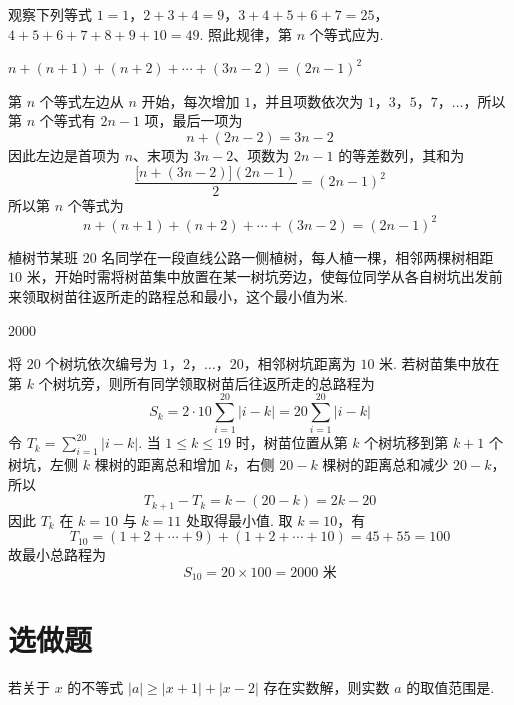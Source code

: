 \begin{problem}
观察下列等式 \(1 = 1\)，\(2 + 3 + 4 = 9\)，\(3 + 4 + 5 + 6 + 7 = 25\)，\(4 + 5 + 6 + 7 + 8 + 9 + 10 = 49\). 照此规律，第 \(n\) 个等式应为\fillinblank{}.
\end{problem}

\begin{answer}
\(n+(n+1)+(n+2)+\cdots+(3n-2)=(2n-1)^2\)
\end{answer}

\begin{solution}
第 \(n\) 个等式左边从 \(n\) 开始，每次增加 \(1\)，并且项数依次为 \(1\)，\(3\)，\(5\)，\(7\)，\(\ldots\)，所以第 \(n\) 个等式有 \(2n-1\) 项，最后一项为
\[
n+(2n-2)=3n-2
\]
因此左边是首项为 \(n\)、末项为 \(3n-2\)、项数为 \(2n-1\) 的等差数列，其和为
\[
\frac{\bigl[n+(3n-2)\bigr](2n-1)}{2}=(2n-1)^2
\]
所以第 \(n\) 个等式为
\[
n+(n+1)+(n+2)+\cdots+(3n-2)=(2n-1)^2
\]
\end{solution}

\begin{problem}
植树节某班 \(20\) 名同学在一段直线公路一侧植树，每人植一棵，相邻两棵树相距 \(10\text{ 米}\)，开始时需将树苗集中放置在某一树坑旁边，使每位同学从各自树坑出发前来领取树苗往返所走的路程总和最小，这个最小值为\fillinblank{}\(\text{米}\).
\end{problem}

\begin{answer}
\(2000\)
\end{answer}

\begin{solution}
将 \(20\) 个树坑依次编号为 \(1\)，\(2\)，\(\ldots\)，\(20\)，相邻树坑距离为 \(10\text{ 米}\). 若树苗集中放在第 \(k\) 个树坑旁，则所有同学领取树苗后往返所走的总路程为
\[
S_k=2\cdot10\sum_{i=1}^{20}|i-k|=20\sum_{i=1}^{20}|i-k|
\]
令 \(T_k=\sum_{i=1}^{20}|i-k|\). 当 \(1\leqslant k\leqslant19\) 时，树苗位置从第 \(k\) 个树坑移到第 \(k+1\) 个树坑，左侧 \(k\) 棵树的距离总和增加 \(k\)，右侧 \(20-k\) 棵树的距离总和减少 \(20-k\)，所以
\[
T_{k+1}-T_k=k-(20-k)=2k-20
\]
因此 \(T_k\) 在 \(k=10\) 与 \(k=11\) 处取得最小值. 取 \(k=10\)，有
\[
T_{10}=(1+2+\cdots+9)+(1+2+\cdots+10)=45+55=100
\]
故最小总路程为
\[
S_{10}=20\times100=2000\text{ 米}
\]
\end{solution}

\section{选做题}

\begin{problem}
若关于 \(x\) 的不等式 \(\left|a\right| \geqslant \left|x + 1\right| + \left|x - 2\right|\) 存在实数解，则实数 \(a\) 的取值范围是\fillinblank{}.
\end{problem}

